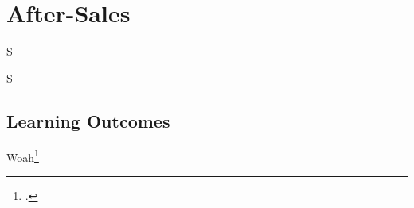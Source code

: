 \frenchspacing
\chapter{After-Sales}
\epigraph{S}{S}

%
\section{Learning Outcomes}
Woah\footcite{welin2024creating}

%
\printbibliography[heading=secbibliography, title={References}]